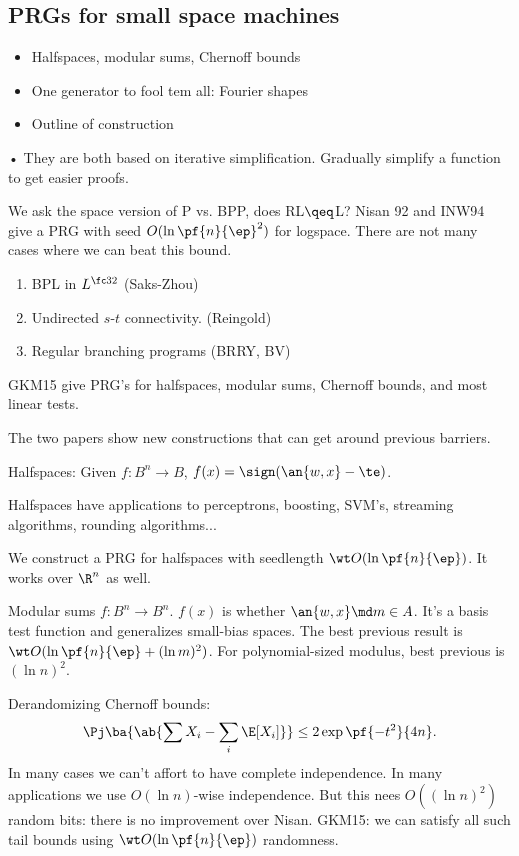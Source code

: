 \subsection{PRGs for small space machines}

\begin{itemize}
\item
Halfspaces, modular sums, Chernoff bounds
\item
One generator to fool tem all: Fourier shapes
\item
Outline of construction
\end{itemize}•
They are both based on iterative simplification. Gradually simplify a function to get easier proofs.

We ask the space version of P vs. BPP, does RL$\qeq$L? Nisan 92 and INW94 give a PRG with seed $O(\ln\pf{n}{\ep}^2)$ for logspace. There are not many cases where we can beat this bound.
\begin{enumerate}
\item
BPL in $L^{\fc 32}$ (Saks-Zhou)
\item
Undirected $s$-$t$ connectivity. (Reingold)
\item
Regular branching programs (BRRY, BV)
\end{enumerate}
GKM15 give PRG's for halfspaces, modular sums, Chernoff bounds, and most linear tests.

The two papers show new constructions that can get around previous barriers.

Halfspaces: Given $f:B^n\to B$, $f(x)=\sign(\an{w,x}-\te)$.

Halfspaces have applications to perceptrons, boosting, SVM's, streaming algorithms, rounding algorithms...

We construct a PRG for halfspaces with seedlength $\wt O(\ln\pf{n}{\ep})$. It works over $\R^n$ as well.

Modular sums $f:B^n\to B^n$. $f(x)$ is whether $\an{w,x}\md m\in A$. It's a basis test function and generalizes small-bias spaces. The best previous result is $\wt O(\ln \pf{n}{\ep}+(\ln m)^2)$. For polynomial-sized modulus, best previous is $(\ln n)^2$.

Derandomizing Chernoff bounds: 
\[
\Pj\ba{
\ab{\sum X_i-\sum_i \E[X_i]}
}\le 2\exp\pf{-t^2}{4n}.
\]
In many cases we can't affort to have complete independence. In many applications we use $O(\ln n)$-wise independence. But this nees $O((\ln n)^2)$ random bits: there is no improvement over Nisan. GKM15: we can satisfy all such tail bounds using $\wt O(\ln\pf{n}{\ep})$ randomness.

